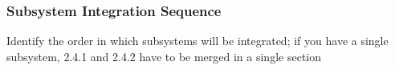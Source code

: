 \subsubsection{Subsystem Integration Sequence} Identify the order in which subsystems will be integrated;  if you have a single subsystem, 2.4.1 and 2.4.2 have to be merged in a single section





